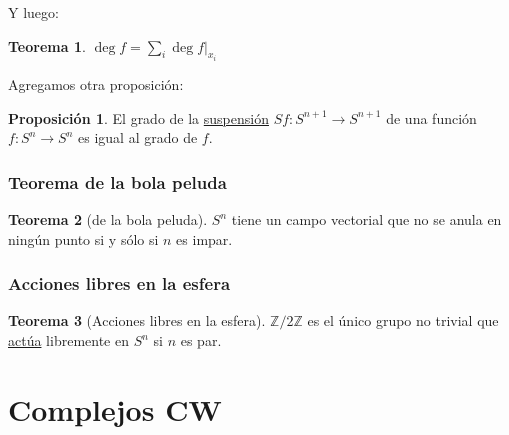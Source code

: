 \documentclass[spanish]{book}
\theoremstyle{definition}
\newtheorem*{teo}{Teorema}
\newtheorem*{prop}{Proposición}
\newcommand{\Z}{\mathbb{Z}}
\begin{document}
	Y luego:
	\begin{teo}
		$\deg f=\sum_i\deg f|_{x_i}$
	\end{teo}
	Agregamos otra proposición:
	\begin{prop}
		El grado de la \hyperref[fsusp]{suspensión} $Sf:S^{n+1}\to S^{n+1}$ de una función $f:S^n\to S^n$ es igual al grado de $f$.
	\end{prop}
\subsection{Teorema de la bola peluda}
	\begin{teo}[de la bola peluda]
		$S^n$ tiene un campo vectorial que no se anula en ningún punto si y sólo si $n$ es impar.
	\end{teo}

\subsection{Acciones libres en la esfera}
	\begin{teo}[Acciones libres en la esfera]
		$\Z/2\Z$ es el único grupo no trivial que \hyperref[sec:acciones]{actúa} libremente en $S^n$ si $n$ es par.
	\end{teo}

\chapter{Complejos CW}\label{chap:CCW}
\end{document}
